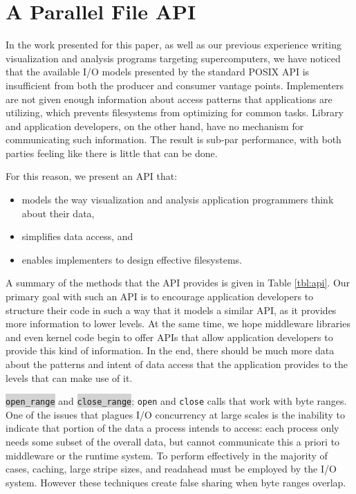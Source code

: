 
\section{A Parallel File API}\label{sec:design}

In the work presented for this paper, as well as our previous
experience writing visualization and analysis programs targeting
supercomputers, we have noticed that the available I/O models presented
by the standard POSIX API is insufficient from both the producer and
consumer vantage points.  Implementers are not given enough information
about access patterns that applications are utilizing, which prevents
filesystems from optimizing for common tasks.  Library and application
developers, on the other hand, have no mechanism for communicating such
information.  The result is sub-par performance, with both parties
feeling like there is little that can be done.

For this reason, we present an API that:

\begin{itemize}
  \item models the way visualization and analysis application
  programmers think about their data,
  \item simplifies data access, and
  \item enables implementers to design effective filesystems.
\end{itemize}

A summary of the methods that the API provides is given in Table
\ref{tbl:api}.  Our primary goal with such an API is to encourage
application developers to structure their code in such a way that it
models a similar API, as it provides more information to lower levels.
At the same time, we hope middleware libraries and even kernel code
begin to offer APIs that allow application developers to provide this
kind of information.  In the end, there should be much more data about
the patterns and intent of data access that the application provides to
the levels that can make use of it.

\colorbox{lightgray}{\texttt{open\_range}} and
\colorbox{lightgray}{\texttt{close\_range}}; \verb!open! and \verb!close!
calls that work with byte ranges.
One of the issues that plagues I/O concurrency
at large scales is the inability to indicate that portion of the data
a process intends to
access: each process only needs some subset of the overall data, but
cannot communicate this a priori to middleware or the runtime system.
To perform effectively in the majority of cases, caching, large stripe
sizes, and readahead must be employed by the I/O system.  However these
techniques create false sharing when byte ranges overlap.


